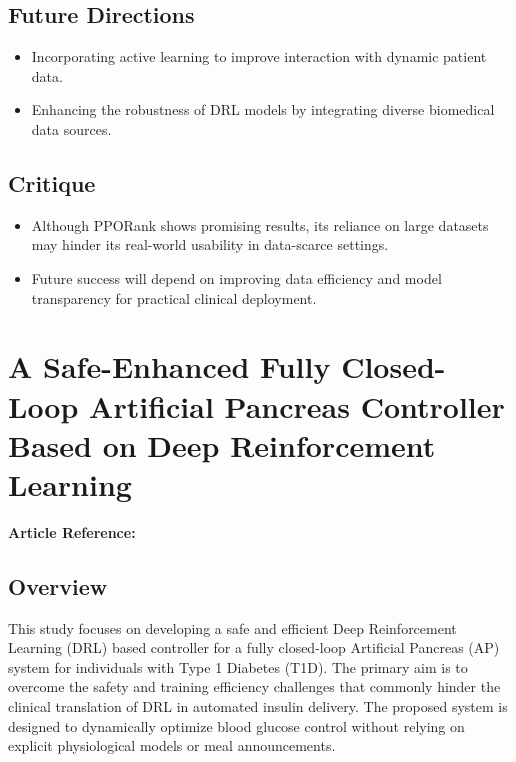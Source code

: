 \subsection*{Future Directions}
\begin{itemize}
    \item Incorporating active learning to improve interaction with dynamic patient data.
    \item Enhancing the robustness of DRL models by integrating diverse biomedical data sources.
\end{itemize}

\subsection*{Critique}
\begin{itemize}
    \item Although PPORank shows promising results, its reliance on large datasets may hinder its real-world usability in data-scarce settings.
    \item Future success will depend on improving data efficiency and model transparency for practical clinical deployment.
\end{itemize}


\section{A Safe-Enhanced Fully Closed-Loop Artificial Pancreas Controller Based on Deep Reinforcement Learning}
\textbf{Article Reference:} \cite{zhaoSafeenhancedFullyClosedloop2025}

\subsection*{Overview}
This study focuses on developing a safe and efficient Deep Reinforcement Learning (DRL) based controller for a fully closed-loop Artificial Pancreas (AP) system for individuals with Type 1 Diabetes (T1D). The primary aim is to overcome the safety and training efficiency challenges that commonly hinder the clinical translation of DRL in automated insulin delivery. The proposed system is designed to dynamically optimize blood glucose control without relying on explicit physiological models or meal announcements.

